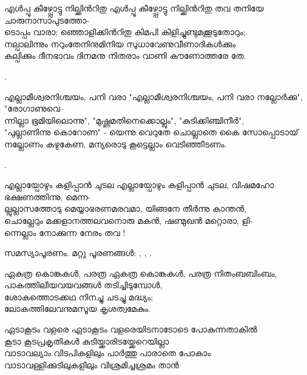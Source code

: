 \begin{enumerate}
\begin{slokam}{\VSr}{\Unk}{എൾപ്പൂ കീഴ്പ്പോട്ടു നില്ക്കിൻറിതു}
എൾപ്പൂ കീഴ്പ്പോട്ടു നില്ക്കിൻറിതു തവ തനിയേ ചാരുനാസാപുടത്തോ-\\
ടൊപ്പം വാരാ; ഞ്ഞൊളിക്കിൻറിതു കിമപി കിളിച്ചുണ്ടുമക്കൂടുതോറും;\\
നല്പാലിന്നും നറുംതേനിനുമിനിയ സുധാവേണുവീണാദികൾക്കും\\
കല്പിക്കും ദീനഭാവം ദിനമനു നിതരാം വാണി കൗണോത്തരേ തേ.
\end{slokam}


.

\begin{slokam}{\VSv}{\UN}{എല്ലാമീശ്വരനിശ്ചയം, പനി വരാ}
"എല്ലാമീശ്വരനിശ്ചയം, പനി വരാ നല്ലോർക്കു", "രോഗാണുവെ--\\
ന്നില്ലാ ഭൂമിയിലൊന്നു", "മുഷ്ണമതിനെക്കൊല്ലും", "കുടിക്കിഞ്ചിനീർ",\\
"പുല്ലാണിന്നു കൊറോണ" - യെന്നു വെറുതേ ചൊല്ലാതെ കൈ സോപ്പൊടായ്\\
നല്ലോണം കഴുകേണ, മന്യരൊടു കൂട്ടെല്ലാം വെടിഞ്ഞീടണം.
\end{slokam}

.


\begin{slokam}{\VSr}{\VenM}{എല്ലായ്പോഴും കളിപ്പാൻ ചുടല}
എല്ലായ്പോഴും കളിപ്പാൻ ചുടല, വിഷമഹോ ഭക്ഷണത്തിന്നു, മെന്ന-\\
ല്ലുല്ലാസത്തോടു മെയ്യാഭരണമരവമാ, യിങ്ങനേ തീർന്നു കാന്തൻ,\\
ചൊല്ലേറും മക്കളാനത്തലവനൊരു മകൻ, ഷണ്മുഖൻ മറ്റൊരാ, ളി-\\
ന്നെല്ലാം നോക്കുന്ന നേരം തവ !
\end{slokam}


സമസ്യാപൂരണം. മറ്റു പൂരണങ്ങൾ: , , .


\begin{slokam}{\VVt}{\Ull}{ഏകത്ര കൊങ്കകള്‍, പരത്ര}
ഏകത്ര കൊങ്കകള്‍, പരത്ര നിതംബബിംബം,\\
പാകത്തിലീയവയവങ്ങള്‍ തടിച്ചിടുമ്പോള്‍,\\
ശോകത്തൊടക്കഥ നിനച്ചു ചടച്ചു മദ്ധ്യം;\\
ലോകത്തിലേവനുമസൂയ കൃശത്വമേകും.
\end{slokam}



\begin{slokam}{\VMk}{\KV}{ഏടാകൂടം വളരെ}
ഏടാകൂടം വളരെയിടനാടോടെ പോകുന്നതാകിൽ\\
കൂടാ കൂടപ്രകൃതികൾ കുടിയ്ക്കാരിടയ്ക്കേറെയില്ലാ\\
വാടാവല്യാം വിടപികളിലും പാർത്തു പാരാതെ പോകാം\\
വാടാവള്ളിക്കുടിലുകളിലും വിശ്രമിച്ചശ്രമം താൻ
\end{slokam}


\end{enumerate}
